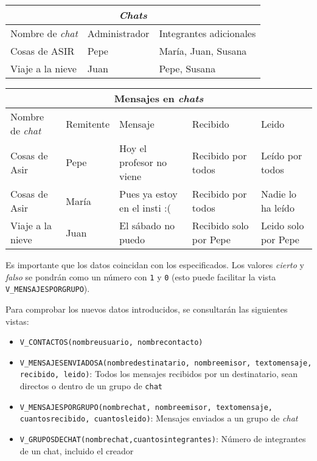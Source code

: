 \begin{homeworkProblem}
  \begin{tabular}{|l|l|l|}
    \hline
    \multicolumn{3}{|c|}{\textit{Chats}} \\
    \hline
    Nombre de \textit{chat} & Administrador & Integrantes adicionales \\
    \hline
    Cosas de ASIR & Pepe & María, Juan, Susana \\
    Viaje a la nieve & Juan & Pepe, Susana \\
    \hline
  \end{tabular}

  
  \begin{tabular}{|l|l|l|l|l|}
    \hline
    \multicolumn{5}{|c|}{Mensajes en \textit{chats}} \\
    \hline
    Nombre de \textit{chat} & Remitente & Mensaje & Recibido & Leido \\
    \hline
    Cosas de Asir & Pepe & Hoy el profesor no viene & Recibido por todos & Leído por todos \\
    Cosas de Asir & María & Pues ya estoy en el insti :( & Recibido por todos & Nadie lo ha leído \\
    Viaje a la nieve & Juan & El sábado no puedo & Recibido solo por Pepe & Leido solo por Pepe \\
    \hline
  \end{tabular}
  
  Es importante que los datos coincidan con los especificados. Los valores \textit{cierto} y \textit{falso} se pondrán como un número con \texttt{1} y \texttt{0} (esto puede facilitar la vista \texttt{V\_MENSAJESPORGRUPO}).
  

  Para comprobar los nuevos datos introducidos, se consultarán las siguientes vistas:
  
  \begin{itemize}
  \item \texttt{V\_CONTACTOS(nombreusuario, nombrecontacto)}
  
  \item \texttt{V\_MENSAJESENVIADOSA(nombredestinatario, nombreemisor, textomensaje, recibido, leido)}: Todos los mensajes recibidos por un destinatario, sean directos o dentro de un grupo de \texttt{chat}
  \item \texttt{V\_MENSAJESPORGRUPO(nombrechat, nombreemisor, textomensaje, cuantosrecibido, cuantosleido)}: Mensajes enviados a un grupo de \textit{chat}
    
  \item \texttt{V\_GRUPOSDECHAT(nombrechat,cuantosintegrantes)}: Número de integrantes de un chat, incluido el creador


\end{itemize}
\end{homeworkProblem}
